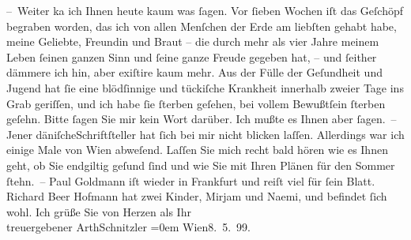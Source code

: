 \begin{ledgroupsized}[t]{13cm}
           \pstart
           – Weiter ka{\geminationn} ich Ihnen heute kaum was ſagen. Vor ſieben
               Wochen iſt das Geſchöpf
               begraben worden, das ich von allen {\pb}Menſchen der
               Erde am liebſten gehabt habe, meine Geliebte, Freundin und Braut – die durch mehr als
               vier Jahre meinem Leben ſeinen ganzen Sinn und ſeine ganze Freude gegeben hat, – und
               ſeither dämmere ich hin, aber exiſtire kaum mehr. Aus der Fülle der Geſundheit und
               Jugend hat ſie eine blödſinnige und tückiſche Krankheit innerhalb zweier Tage ins
               Grab geriſſen, und ich habe ſie ſterben geſehen, bei vollem Bewußt{\pb}ſein ſterben geſehn. Bitte ſagen Sie mir kein Wort
               darüber. Ich mußte es Ihnen aber ſagen. –\pend
           \pstart
           Jener däniſcheSchriftſteller hat ſich bei
               mir nicht blicken laſſen. Allerdings war ich einige Male von Wien abweſend. Laſſen Sie mich recht bald hören wie es Ihnen
               geht, ob Sie endgiltig geſund ſind und wie Sie mit Ihren Plänen für den Sommer
               ſtehn. –\pend
           \pstart
           Paul Goldmann iſt wieder in Frankfurt und reiſt viel für ſein Blatt.\pend
           \pstart
           {\pb}Richard Beer Hofmann hat zwei Kinder, Mirjam und Naemi, und befindet ſich wohl.\pend
           \pstart
           Ich grüße Sie von Herzen als Ihr{\\[\baselineskip]}treuergebener
                  \spacefill\mbox{ArthSchnitzler}\pend
           \leftskip=0em{}\pstart
           Wien8. 5. 99.\pend
           
         
         \endnumbering{}\end{ledgroupsized}  \newcommand{\dateiname}{L00915}\newcommand{\titel}{Arthur Schnitzler an Georg Brandes, 8. 5. 1899}\newcommand{\editorInnen}{Martin Anton Müller und Gerd-Hermann Susen}
      
